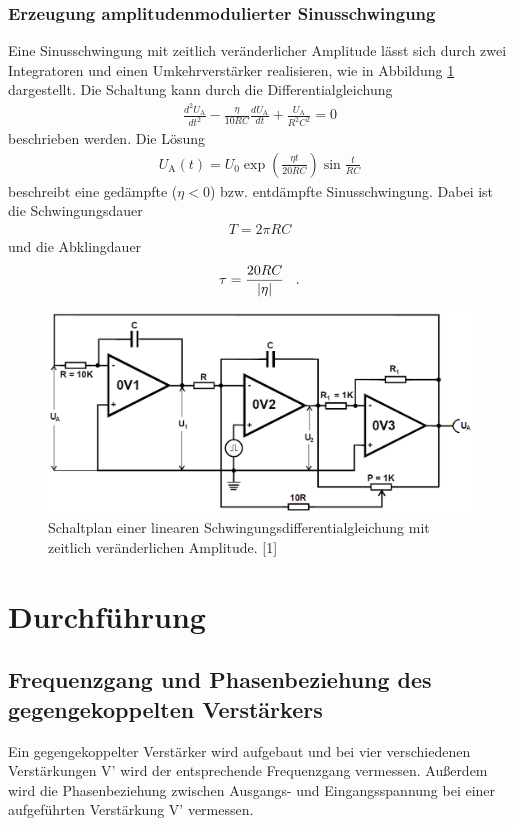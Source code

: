 \documentclass[]{scrartcl}
\let\oldsection\section
\renewcommand\section{\clearpage\oldsection}
\begin{document}
\subsubsection{Erzeugung amplitudenmodulierter Sinusschwingung}
Eine Sinusschwingung mit zeitlich veränderlicher Amplitude lässt sich durch zwei Integratoren und einen Umkehrverstärker realisieren, wie in Abbildung \ref{fig:schalplan_schwingung} dargestellt.
Die Schaltung kann durch die Differentialgleichung
\begin{align}
\frac{d^2 U_\text{A}}{dt^2}-\frac{\eta}{10 RC} \frac{d U_\text{A}}{dt}+\frac{U_\text{A}}{R^2C^2}=0
\end{align}
beschrieben werden. Die Lösung 
\begin{align}
U_\text{A}\left(t\right)=U_0\exp \left(\frac{\eta t}{20 RC}\right)\sin \frac{t}{RC}
\end{align}
beschreibt eine gedämpfte ($\eta < 0$) bzw. entdämpfte Sinusschwingung. Dabei ist die Schwingungsdauer
\begin{align}
T=2\pi RC
\end{align}
und die Abklingdauer
\begin{align}
\tau=\frac{20RC}{\left|\eta \right| }\hspace{0.3cm}\text{.}
\end{align}
\begin{figure}[H]
\centering
\includegraphics[width=13cm]{images/schaltplan_schwingung.png}
\caption{Schaltplan einer linearen Schwingungsdifferentialgleichung mit zeitlich veränderlichen Amplitude. [1]}
\label{fig:schalplan_schwingung}
\end{figure}


\newpage

\section{Durchführung}

\subsection{Frequenzgang und Phasenbeziehung des gegengekoppelten Verstärkers}
Ein gegengekoppelter Verstärker wird aufgebaut und bei vier verschiedenen Verstärkungen V' wird der entsprechende Frequenzgang vermessen. Außerdem wird die Phasenbeziehung zwischen Ausgangs- und Eingangsspannung bei einer aufgeführten Verstärkung V' vermessen.
\end{document}
